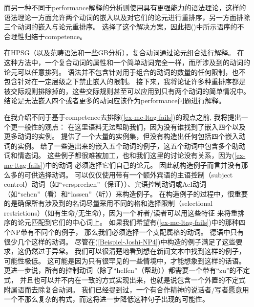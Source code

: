 而另一种不同于performance解释的分析则使用具有更强能力的语法理论，这样的语法理论一方面允许两个动词的嵌入以及对它们的论元进行重排序，另一方面排除三个动词的嵌入与论元重排序。
\citet{JBR2000a}选择了这个解决方案，因此把()中所示语序的不合理性归结于competence。 

在HPSG（以及范畴语法\indexcg 和一些GB分析\indexgb），复合动词通过论元组合进行解释\citep{HN89b,HN94a}。 
在这种方法中，一个复合动词的属性和一个简单动词完全一样，而所涉及到的动词的论元可以任意排列。
语法并不包含针对用于组合的动词的数量的任何限制，也不包含针对在一定层级之下禁止嵌入的限制。
接下来，我将论证许多种重排序都是被交际规则排除掉的，这些交际规则甚至可以应用到只有两个动词的简单情况中。
结论是无法嵌入四个或者更多的动词应该作为performance问题进行解释。

在我介绍不同于基于competence去排除(\ref{ex-mc-ltag-fails})的观点之前, 我将提出一个更一般性的观点：
在这里语料无法帮助我们，因为没有谁找到了嵌入四个以及更多动词的实例。
\citet{Bech55a}提供了一个大量的实例集，但没有构造出任何包括四个嵌入动词的实例。
\citet[--95]{Meurers99c}给了一些造出来的嵌入五个动词的例子，这五个动词中包含多个助动词和情态词。
这些例子都很难被加工，也和我们这里的讨论没有关系，因为(\ref{ex-mc-ltag-fails})中的动词
必须选择它们自己的论元。
因此就构造例子而言并没有那么多的可供选择动词。
可以仅仅使用带有一个额外宾语的主语控制（subject control）动词（如``versprechen''（保证））、宾语控制动词或AcI动词（如``sehen''（看）和``lassen''（听））来构造例子。
在构造例子的过程中，很重要的是确保所有涉及到的名词尽量采用不同的格和选择限制（selectional restrictions）（如有生命/无生命），因为一个听者/读者可以用这些特征
来将重排序的论元匹配到它们的中心词上。
如果我们希望有(\ref{ex-mc-ltag-fails})中的那种四个NP带有不同个的例子，
那么我们必须选择一个支配属格的动词。
德语中只有很少几个这样的动词。
尽管\citet{JBR2000a}在(\ref{Beispiel-Joshi-NP4})中构造的例子满足了这些要求，这仍然过于异常。
我们可以很清楚地看到想在新闻文本中找到这样的例子，可能性极低。
这可能是因为只有很罕见的一些情境中，才能想象到这样的话语。
更进一步说，所有的控制动词（除了``helfen''（帮助））都需要一个带有``zu''的不定式，
并且也可以并不内在一致的方式实现出来，也就是说包含一个外置的不定式附属语而去除复合动词。
我们已经提到过，一个有合作精神的说话者/写者愿意用一个不那么复杂的构式，而这将进一步降低这种句子出现的可能性。

